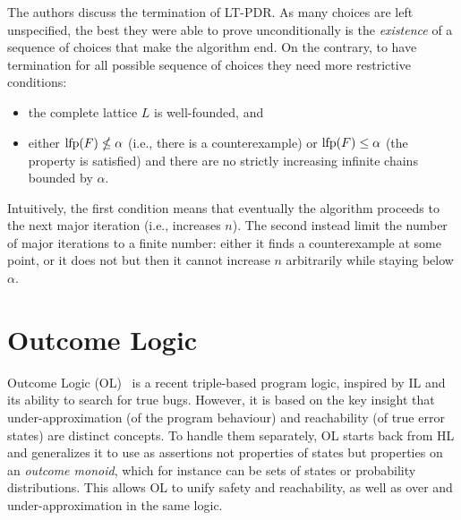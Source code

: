 The authors discuss the termination of LT-PDR. As many choices are left unspecified, the best they were able to prove unconditionally is the \emph{existence} of a sequence of choices that make the algorithm end. On the contrary, to have termination for all possible sequence of choices they need more restrictive conditions:
\begin{itemize}
	\item the complete lattice $L$ is well-founded, and
	\item either $\text{lfp}(F) \nleq \alpha$ (i.e., there is a counterexample) or $\text{lfp}(F) \le \alpha$ (the property is satisfied) and there are no strictly increasing infinite chains bounded by $\alpha$.
\end{itemize}
Intuitively, the first condition means that eventually the algorithm proceeds to the next major iteration (i.e., increases $n$). The second instead limit the number of major iterations to a finite number: either it finds a counterexample at some point, or it does not but then it cannot increase $n$ arbitrarily while staying below $\alpha$.

\section{Outcome Logic}\label{sec:sota:ol}
Outcome Logic (OL)~\cite{ZDS23} is a recent triple-based program logic, inspired by IL and its ability to search for true bugs. However, it is based on the key insight that under-approximation (of the program behaviour) and reachability (of true error states) are distinct concepts. To handle them separately, OL starts back from HL and generalizes it to use as assertions not properties of states but properties on an \emph{outcome monoid}, which for instance can be sets of states or probability distributions. This allows OL to unify safety and reachability, as well as over and under-approximation in the same logic.


